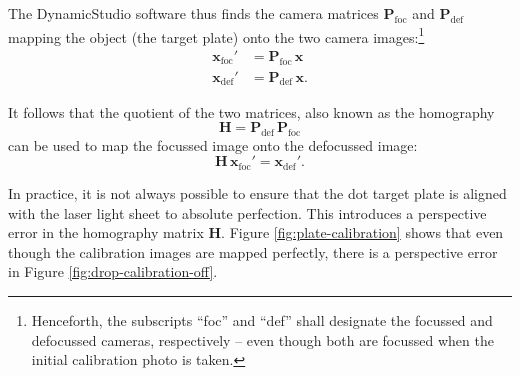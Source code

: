 \documentclass[10pt]{book}
\begin{document}
The DynamicStudio software thus finds the camera matrices
$\mathbf{P}_\text{foc}$ and $\mathbf{P}_\text{def}$ mapping the
object (the target plate) onto the two camera images:\footnote{Henceforth, the
    subscripts ``foc'' and ``def'' shall designate the focussed and defocussed
    cameras, respectively -- even though both are focussed when the initial
calibration photo is taken.}
\begin{align}
    \mathbf{x}_\text{foc}' &= \mathbf{P}_\text{foc} \, \mathbf{x} \\
    \mathbf{x}_\text{def}' &= \mathbf{P}_\text{def} \, \mathbf{x}.
\end{align}

It follows that the quotient of the two matrices, also known as the homography
\begin{equation}
    \mathbf{H} = \mathbf{P}_\text{def} \, \mathbf{P}_\text{foc}
\end{equation}
can be used to map the focussed image onto the defocussed image:
\begin{equation}
    \mathbf{H}\, \mathbf{x}_\text{foc}' = \mathbf{x}_\text{def}'.
    \label{homography-definition}
\end{equation}

In practice, it is not always possible to ensure that the dot target plate is
aligned with the laser light sheet to absolute perfection. This introduces a
perspective error in the homography matrix $\mathbf{H}$. Figure
\ref{fig:plate-calibration} shows that even though the calibration images
are mapped perfectly, there is a perspective error in Figure
\ref{fig:drop-calibration-off}.
\end{document}
